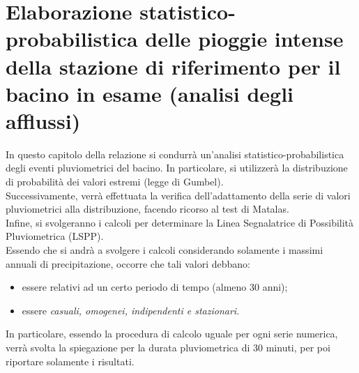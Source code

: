 \section{Elaborazione statistico-probabilistica delle pioggie intense della stazione di riferimento per il bacino in esame (analisi degli afflussi)}
In questo capitolo della relazione si condurrà un'analisi statistico-probabilistica degli eventi pluviometrici del bacino. In particolare, si utilizzerà la distribuzione di probabilità dei valori estremi (legge di Gumbel).\\
Successivamente, verrà effettuata la verifica dell'adattamento della serie di valori pluviometrici alla distribuzione, facendo ricorso al test di Matalas.\\
Infine, si svolgeranno i calcoli per determinare la Linea Segnalatrice di Possibilità Pluviometrica (LSPP).\\
Essendo che si andrà a svolgere i calcoli considerando solamente i massimi annuali di precipitazione, occorre che tali valori debbano: 
\begin{itemize}
    \item essere relativi ad un certo periodo di tempo (almeno 30 anni);
    \item essere \textit{casuali, omogenei, indipendenti e stazionari}.
\end{itemize} 
In particolare, essendo la procedura di calcolo uguale per ogni serie numerica, verrà svolta la spiegazione per la durata pluviometrica di 30 minuti, per poi riportare solamente i risultati.

